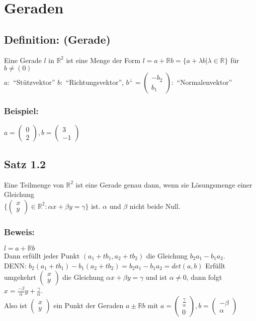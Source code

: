 \section{Geraden}
%
%
%
\subsection{Definition: (Gerade)}
%
%
%
Eine Gerade $l$ in $\mathbb{R}^{2}$ ist eine Menge der Form $l=a+\mathbb{R}b=\{a+\lambda b|\lambda \in \mathbb{R}\}$ für $b \neq (0)$\\
$a:$ "`Stützvektor"' \quad $b:$ "`Richtungsvektor"', \quad $b^{\perp}=\begin{pmatrix}-b_{2} \\ b_{1} \end{pmatrix}:$ "`Normalenvektor"'
%
\subsubsection{Beispiel: }
$a=\begin{pmatrix} 0 \\ 2 \end{pmatrix}, b=\begin{pmatrix} 3 \\ -1 \end{pmatrix}$
%
%
%
%
\subsection{Satz 1.2}
Eine Teilmenge von $\mathbb{R}^{2}$ ist eine Gerade genau dann, wenn sie Lösungsmenge einer Gleichung \\
$\{\begin{pmatrix}x \\ y \end{pmatrix} \in \mathbb{R}^{2} : \alpha x + \beta y = \gamma\}$ ist. $\alpha$ und $\beta$ nicht beide Null.
%
%
%
\subsubsection{Beweis:}
$l=a + \mathbb{R}b$\\
Dann erfüllt jeder Punkt $(a_{1}+tb_{1},a_{2}+tb_{2})$ die Gleichung $b_{2}a_{1}-b_{1}a_{2}$.\\
DENN:  $b_{2}(a_{1}+tb_{1})-b_{1}(a_{2}+tb_{2})=b_{2}a_{1}-b_{1}a_{2}=det(a,b)$ Erfüllt umgekehrt $\begin{pmatrix}x \\ y \end{pmatrix}$ die Gleichung $\alpha x + \beta y = \gamma$ und ist $\alpha \neq 0$, dann folgt $x=\frac{-\beta}{\alpha}y+\frac{\gamma}{\alpha}$. \\ 
Also ist $\begin{pmatrix}x \\ y \end{pmatrix}$ ein Punkt der Geraden $a \pm \mathbb{R}b$ mit $a=\begin{pmatrix} \frac{\gamma}{\alpha} \\ 0 \end{pmatrix}, b=\begin{pmatrix} -\beta \\ \alpha \end{pmatrix}$\\
%
%
%
